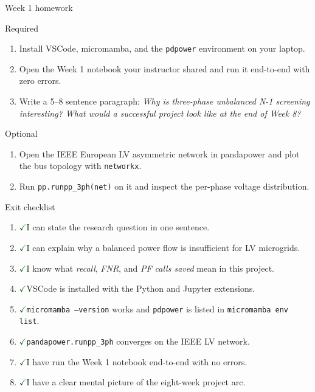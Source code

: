 \documentclass[aspectratio=169,10pt]{beamer}
\newcommand{\code}[1]{\texttt{#1}}
\newcommand{\checkitem}{\textcolor{darkgreen}{\Large$\checkmark$}\;}
\begin{document}
\begin{frame}{Week 1 homework}
\begin{block}{Required}
\begin{enumerate}
  \item Install VSCode, micromamba, and the \code{pdpower} environment on your laptop.
  \item Open the Week 1 notebook your instructor shared and run it end-to-end with zero errors.
  \item Write a 5--8 sentence paragraph: \emph{Why is three-phase unbalanced N-1 screening interesting? What would a successful project look like at the end of Week 8?}
\end{enumerate}
\end{block}
\begin{block}{Optional}
\begin{enumerate}
  \item Open the IEEE European LV asymmetric network in pandapower and plot the bus topology with \code{networkx}.
  \item Run \code{pp.runpp\_3ph(net)} on it and inspect the per-phase voltage distribution.
\end{enumerate}
\end{block}
\end{frame}

\begin{frame}{Exit checklist}
\begin{enumerate}
  \item \checkitem I can state the research question in one sentence.
  \item \checkitem I can explain why a balanced power flow is insufficient for LV microgrids.
  \item \checkitem I know what \emph{recall}, \emph{FNR}, and \emph{PF calls saved} mean in this project.
  \item \checkitem VSCode is installed with the Python and Jupyter extensions.
  \item \checkitem \code{micromamba --version} works and \code{pdpower} is listed in \code{micromamba env list}.
  \item \checkitem \code{pandapower.runpp\_3ph} converges on the IEEE LV network.
  \item \checkitem I have run the Week 1 notebook end-to-end with no errors.
  \item \checkitem I have a clear mental picture of the eight-week project arc.
\end{enumerate}
\end{frame}
\end{document}
